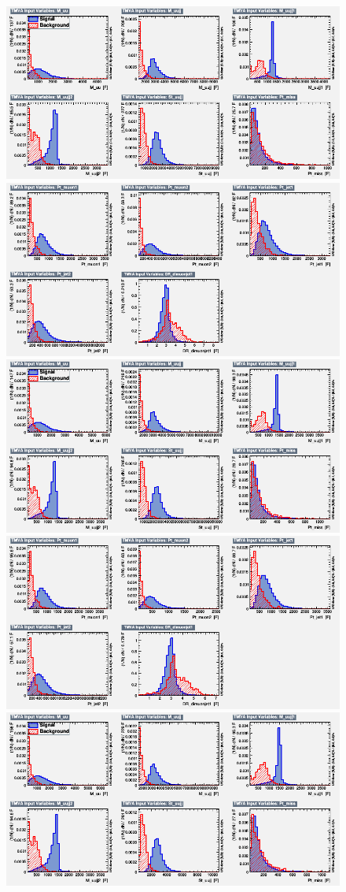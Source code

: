 \begin{figure}[H]
    \centering
    {\includegraphics[width=.49\textwidth]{Images/Analysis/Results_LQToBMu_pair_uubj_BDTG_FullRun2_2023_01_25_020318/1300/variables_id_c1.png}}
    {\includegraphics[width=.49\textwidth]{Images/Analysis/Results_LQToBMu_pair_uubj_BDTG_FullRun2_2023_01_25_020318/1300/variables_id_c2.png}}
    {\includegraphics[width=.49\textwidth]{Images/Analysis/Results_LQToBMu_pair_uubj_BDTG_FullRun2_2023_01_25_020318/1400/variables_id_c1.png}}
    {\includegraphics[width=.49\textwidth]{Images/Analysis/Results_LQToBMu_pair_uubj_BDTG_FullRun2_2023_01_25_020318/1400/variables_id_c2.png}}
    {\includegraphics[width=.49\textwidth]{Images/Analysis/Results_LQToBMu_pair_uubj_BDTG_FullRun2_2023_01_25_020318/1500/variables_id_c1.png}}

\end{figure}
